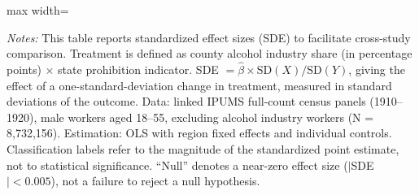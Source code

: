 \documentclass[12pt]{article}
\begin{document}
\begin{table}[H]
\centering
\caption{Standardized Effect Sizes for Main Outcomes}
\label{tab:sde}
\begin{adjustbox}{max width=\textwidth}

\end{adjustbox}
\par\vspace{0.3em}
{\footnotesize \emph{Notes:} This table reports standardized effect sizes (SDE) to facilitate cross-study comparison. Treatment is defined as county alcohol industry share (in percentage points) $\times$ state prohibition indicator. SDE $= \hat{\beta} \times \text{SD}(X) / \text{SD}(Y)$, giving the effect of a one-standard-deviation change in treatment, measured in standard deviations of the outcome. Data: linked IPUMS full-count census panels (1910--1920), male workers aged 18--55, excluding alcohol industry workers (N = 8,732,156). Estimation: OLS with region fixed effects and individual controls. Classification labels refer to the magnitude of the standardized point estimate, not to statistical significance. ``Null'' denotes a near-zero effect size ($|$SDE$| < 0.005$), not a failure to reject a null hypothesis.}
\end{table}
\end{document}
